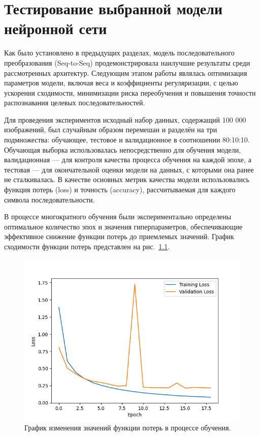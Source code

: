 \documentclass{altsu-report}
\begin{document}
\chapter{Тестирование выбранной модели нейронной сети}

Как было установлено в предыдущих разделах, модель последовательного преобразования (Seq-to-Seq) продемонстрировала наилучшие результаты среди рассмотренных архитектур. Следующим этапом работы являлась оптимизация параметров модели, включая веса и коэффициенты регуляризации, с целью ускорения сходимости, минимизации риска переобучения и повышения точности распознавания целевых последовательностей.

Для проведения экспериментов исходный набор данных, содержащий 100 000 изображений, был случайным образом перемешан и разделён на три подмножества: обучающее, тестовое и валидационное в соотношении 80:10:10. Обучающая выборка использовалась непосредственно для обучения модели, валидационная — для контроля качества процесса обучения на каждой эпохе, а тестовая — для окончательной оценки модели на данных, с которыми она ранее не сталкивалась. В качестве основных метрик качества модели использовались функция потерь (loss) и точность (accuracy), рассчитываемая для каждого символа последовательности.

В процессе многократного обучения были экспериментально определены оптимальное количество эпох и значения гиперпараметров, обеспечивающие эффективное снижение функции потерь до приемлемых значений. График сходимости функции потерь представлен на рис.~\ref{fig:loss}.

\begin{figure}[H]
    \centering
    \includegraphics[width=0.8\linewidth]{imgs/Model_loss.png}
    \caption{График изменения значений функции потерь в процессе обучения.}
    \label{fig:loss}
\end{figure}
\end{document}
